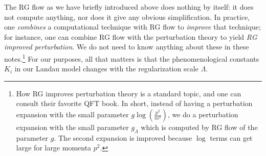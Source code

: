 The RG flow as we have briefly introduced above does nothing by itself: it does not compute anything, nor does it give any obvious simplification. In practice, one \emph{combines} a computational technique with RG flow to \emph{improve} that technique; for instance, one can combine RG flow with the perturbation theory to yield \emph{RG improved perturbation}. We do not need to know anything about these in these notes.\footnote{How RG improves perturbation theory is a standard topic, and one can consult their favorite QFT book. In short, instead of having a perturbation expansion with the small parameter $g\log\left(\frac{p^2}{m^2}\right)$, we do a perturbation expansion with the small parameter $g_\Lambda$ which is computed by RG flow of the parameter $g$. The second expansion is improved because $\log$ terms can get large for large momenta $p^2$.
} For our purposes, all that matters is that the phenomenological constants $K_i$ in our Landau model changes with the regularization scale $\Lambda$. 

